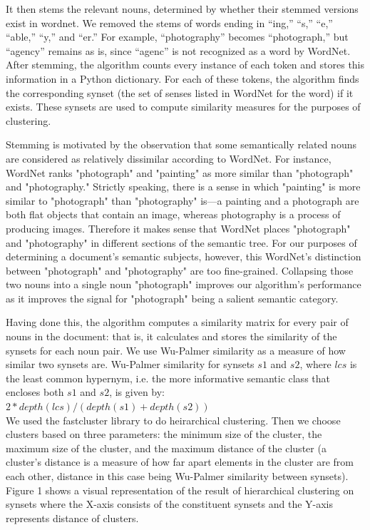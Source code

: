 \documentclass[12pt]{article}
\begin{document}
It then stems the relevant nouns, determined by whether their stemmed versions exist in wordnet. We removed the stems of words ending in ``ing,'' ``s,'' ``e,'' ``able,'' ``y,'' and ``er.'' For example, ``photography'' becomes ``photograph,'' but ``agency'' remains as is, since ``agenc'' is not recognized as a word by WordNet. After stemming, the algorithm counts every instance of each token and stores this information in a Python dictionary. For each of these tokens, the algorithm finds the corresponding synset (the set of senses listed in WordNet for the word) if it exists. These synsets are used to compute similarity measures for the purposes of clustering.

Stemming is motivated by the observation that some semantically related nouns are considered as relatively dissimilar according to WordNet. For instance, WordNet ranks "photograph" and "painting" as more similar than "photograph" and "photography." Strictly speaking, there is a sense in which "painting" is more similar to "photograph" than "photography" is—a painting and a photograph are both flat objects that contain an image, whereas photography is a process of producing images. Therefore it makes sense that WordNet places "photograph" and "photography" in different sections of the semantic tree. For our purposes of determining a document's semantic subjects, however, this WordNet's distinction between "photograph" and "photography" are too fine-grained. Collapsing those two nouns into a single noun "photograph" improves our algorithm's performance as it improves the signal for "photograph" being a salient semantic category.

Having done this, the algorithm computes a similarity matrix for every pair of nouns in the document: that is, it calculates and stores the similarity of the synsets for each noun pair. We use Wu-Palmer similarity as a measure of how similar two synsets are. Wu-Palmer similarity for synsets $s1$ and $s2$, where $lcs$ is the least common hypernym, i.e. the more informative semantic class that encloses both $s1$ and $s2$, is given by:\\

$2*depth(lcs) / (depth(s1) + depth(s2))$\\

We used the fastcluster library to do heirarchical clustering. Then we choose clusters based on three parameters: the minimum size of the cluster, the maximum size of the cluster, and the maximum distance of the cluster (a cluster's distance is a measure of how far apart elements in the cluster are from each other, distance in this case being Wu-Palmer similarity between synsets). Figure 1 shows a visual representation of the result of hierarchical clustering on synsets where the X-axis consists of the constituent synsets and the Y-axis represents distance of clusters.
\end{document}
